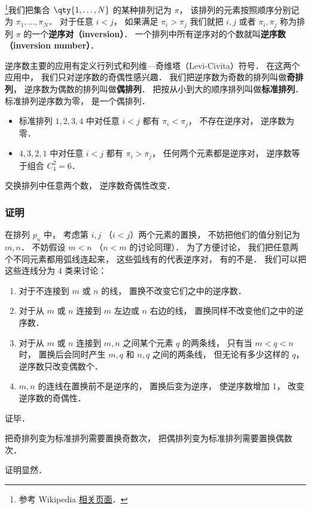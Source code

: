 

\footnote{参考 Wikipedia \href{https://en.wikipedia.org/wiki/Inversion_(discrete_mathematics)}{相关页面}．}我们把集合 $\qty{1,\dots,N}$ 的某种排列记为 $\pi$， 该排列的元素按照顺序分别记为 $\pi_1, \dots, \pi_N$． 对于任意 $i < j$， 如果满足 $\pi_i > \pi_j$ 我们就把 $i, j$ 或者 $\pi_i, \pi_j$ 称为排列 $\pi$ 的一个\textbf{逆序对（inversion）}． 一个排列中所有逆序对的个数就叫\textbf{逆序数（inversion number）}．

逆序数主要的应用有定义行列式和列维—奇维塔（Levi-Civita）符号． 在这两个应用中， 我们只对逆序数的奇偶性感兴趣． 我们把逆序数为奇数的排列叫做\textbf{奇排列}， 逆序数为偶数的排列叫做\textbf{偶排列}． 把按从小到大的顺序排列叫做\textbf{标准排列}． 标准排列逆序数为零， 是一个偶排列．

\begin{example}{}
\begin{itemize}
\item 标准排列 $1,2,3,4$ 中对任意 $i < j$ 都有 $\pi_i < \pi_j$， 不存在逆序对， 逆序数为零．
\item $4,3,2,1$ 中对任意 $i < j$ 都有 $\pi_i > \pi_j$， 任何两个元素都是逆序对， 逆序数等于组合 $C_4^2 = 6$．
\end{itemize}
\end{example}

\begin{theorem}{}
交换排列中任意两个数， 逆序数奇偶性改变． 
\end{theorem}

\subsubsection{证明}
在排列 $p_n$ 中， 考虑第 $i, j$ （$i < j$）两个元素的置换， 不妨把他们的值分别记为 $m, n$． 不妨假设 $m < n$ （$n < m$ 的讨论同理）． 为了方便讨论， 我们把任意两个不同元素都用弧线连起来， 这些弧线有的代表逆序对， 有的不是． 我们可以把这些连线分为 4 类来讨论：
\begin{enumerate}
\item 对于不连接到 $m$ 或 $n$ 的线， 置换不改变它们之中的逆序数．
\item 对于从 $m$ 或 $n$ 连接到 $m$ 左边或 $n$ 右边的线， 置换同样不改变他们之中的逆序数．
\item 对于从 $m$ 或 $n$ 连接到 $m, n$ 之间某个元素 $q$ 的两条线， 只有当 $m < q < n$ 时， 置换后会同时产生 $m,q$ 和 $n,q$ 之间的两条线， 但无论有多少这样的 $q$， 逆序数只改变偶数个．
\item $m,n$ 的连线在置换前不是逆序的， 置换后变为逆序， 使逆序数增加 1， 改变逆序数的奇偶性．
\end{enumerate}
证毕．

\begin{corollary}{}
把奇排列变为标准排列需要置换奇数次， 把偶排列变为标准排列需要置换偶数次．
\end{corollary}
证明显然．

